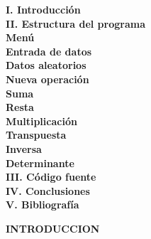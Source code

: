 \documentclass[letterpaper]{article}
\begin{document}
\begin{flushleft}
\textbf{\LARGE I. Introducci\'on\\}
\vspace{0.5cm}
\textbf{\LARGE II. Estructura del programa\\}
\hspace{1.5cm}\textbf{\Large Men\'u\\}
\hspace{1.5cm}\textbf{\Large Entrada de datos\\}
\hspace{1.5cm}\textbf{\Large Datos aleatorios\\}
\hspace{1.5cm}\textbf{\Large Nueva operaci\'on\\}
\hspace{1.5cm}\textbf{\Large Suma\\}
\hspace{1.5cm}\textbf{\Large Resta\\}
\hspace{1.5cm}\textbf{\Large Multiplicaci\'on\\}
\hspace{1.5cm}\textbf{\Large Transpuesta\\}
\hspace{1.5cm}\textbf{\Large Inversa\\}
\hspace{1.5cm}\textbf{\Large Determinante\\}
\vspace{0.5cm}
\textbf{\LARGE III. C\'odigo fuente\\}
\vspace{0.5cm}
\textbf{\LARGE IV. Conclusiones\\}
\vspace{0.5cm}
\textbf{\LARGE V. Bibliograf\'ia\\}
\end{flushleft}

\clearpage

\begin{center}
\textbf{\LARGE INTRODUCCION\\}
\vspace{1.0cm}
\end{center}
\end{document}
